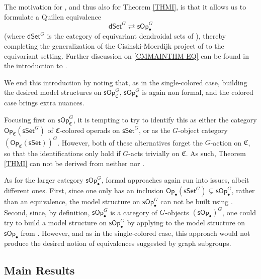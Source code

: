 \documentclass[a4paper,10pt
]{article}%
\numberwithin{equation}{section}
\numberwithin{figure}{section}
\theoremstyle{definition} %
\newcommand{\1}{\ensuremath{\mathbbm 1}}%
\begin{document}
The motivation for 
\cite[Thm. \ref{AC-THMA}]{BP_ACOP},
and thus also for Theorem \ref{THMI},
is that it allows us to formulate 
a Quillen equivalence \cite{BP_TAS}
\begin{equation}\label{CMMAINTHM EQ}
\mathsf{dSet}^G \rightleftarrows \mathsf{sOp}_{\bullet}^G
\end{equation}
(where $\mathsf{dSet}^G$
is the category of equivariant dendroidal sets
of \cite{Per18}), thereby completing the 
generalization of the Cisinski-Moerdijk project of \cite{CM11,CM13a,CM13b} to the equivariant setting.
Further discussion on \eqref{CMMAINTHM EQ} can be found in the introduction to \cite{BP_TAS}.



We end this introduction by noting that, 
as in the single-colored case,
building the desired model structures on 
$\mathsf{sOp}^G_{\mathfrak C}$, $\mathsf{sOp}^G_{\bullet}$
is again non formal, 
and the colored case brings extra nuances.

Focusing first on
$\mathsf{sOp}^G_{\mathfrak C}$,
it is tempting to try to identify this as
either the category
$\mathsf{Op}_{\mathfrak C}(\mathsf{sSet}^G)$
of $\mathfrak{C}$-colored operads on $\mathsf{sSet}^G$,
or as the $G$-object category
$\left(\mathsf{Op}_{\mathfrak C}(\mathsf{sSet})\right)^G$.
However, both of these alternatives forget the 
$G$-action on $\mathfrak C$,
so that the identifications only hold if 
$G$-acts trivially on $\mathfrak{C}$.
As such, Theorem \ref{THMI}
can not be derived from neither 
\cite[Thm. 3.2]{BM03} nor \cite[Prop. 2.6]{Ste16}.

As for the larger category
$\mathsf{sOp}^G_{\bullet}$,
formal approaches again run into issues, albeit different ones.
First, since one only has an inclusion
$\mathsf{Op}_{\bullet}(\mathsf{sSet}^G)
\subsetneq \mathsf{sOp}_{\bullet}^G$,
rather than an equivalence,
the model structure on $\mathsf{sOp}_{\bullet}^G$
can not be built using \cite{Cav}.
Second, since, by definition,
$\mathsf{sOp}^G_{\bullet}$
is a category of $G$-objects
$\left(\mathsf{sOp}_{\bullet}\right)^G$,
one could try to build a model structure
on $\mathsf{sOp}^G_{\bullet}$
by applying \cite[Prop. 2.6]{Ste16}
to the model structure on $\mathsf{sOp}_\bullet$ from \cite{Cav}.
However, and as in the single-colored case,
this approach would not produce
the desired notion of equivalences suggested by graph subgroups.








\subsection{Main Results}
\end{document}
